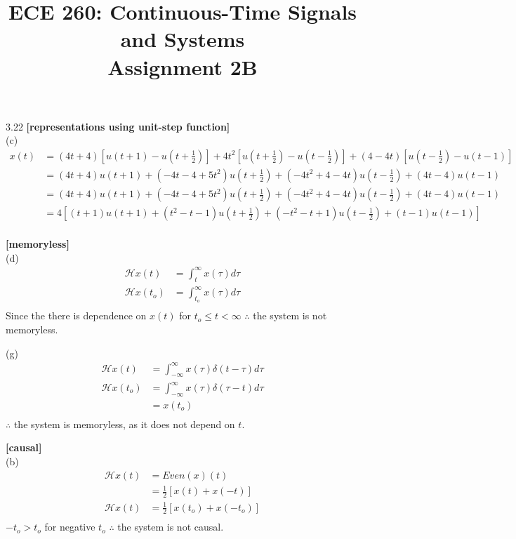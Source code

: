 \documentclass{article}
\title{%
   ECE 260: Continuous-Time Signals and Systems\\
    Assignment 2B\\
    }
\date{}
\begin{document}
\maketitle

3.22 {\bf [representations using unit-step function]}\\
(c)
\begin{equation*}
\begin{split}
    x(t) &= (4t + 4)[u(t + 1) - u(t + \frac{1}{2})] + 4t^2[u(t + \frac{1}{2}) - u(t - \frac{1}{2})] + (4 - 4t)[u(t - \frac{1}{2}) - u(t - 1)]\\
    &= (4t + 4) u (t + 1) + (-4t - 4 + 5t^2) u (t + \frac{1}{2}) + (-4t^2 + 4 - 4t) u (t - \frac{1}{2}) + (4t - 4) u (t - 1)\\
    &= (4t + 4) u (t + 1) + (-4t - 4 + 5t^2) u (t + \frac{1}{2}) + (-4t^2 + 4 - 4t) u (t - \frac{1}{2}) + (4t - 4) u (t - 1)\\
    &= 4[(t + 1) u (t + 1) + (t^2 - t - 1) u (t + \frac{1}{2}) + (-t^2 - t + 1) u (t - \frac{1}{2}) + (t - 1) u (t - 1)]\\
\end{split}
\end{equation*}

 {\bf [memoryless]}\\
(d)
\begin{equation*}
\begin{split}
    \mathcal{H}x(t) &= \int_{t}^{\infty} x(\tau)d\tau\\
    \mathcal{H}x(t_o) &= \int_{t_o}^{\infty} x(\tau)d\tau\\
\end{split}
\end{equation*}
Since the there is dependence on $x(t)$ for $t_o \leq t < \infty$ $\therefore$ the system is not memoryless.

(g)
\begin{equation*}
\begin{split}
    \mathcal{H}x(t) &= \int_{-\infty}^{\infty} x(\tau) \delta (t - \tau) d\tau\\
     \mathcal{H}x(t_o) &= \int_{-\infty}^{\infty} x(\tau) \delta (\tau - t) d\tau\\
    &= x(t_o)\\
\end{split}
\end{equation*}
$\therefore$ the system is memoryless, as it does not depend on $t$.


 {\bf [causal]}\\
(b)
\begin{equation*}
\begin{split}
    \mathcal{H}x(t) &= Even(x)(t)\\
    &= \frac{1}{2}[x(t) + x(-t)]\\
    \mathcal{H}x(t) &= \frac{1}{2}[x(t_o) + x(-t_o)]\\
\end{split}
\end{equation*}
$-t_o > t_o$ for negative $t_o$ $\therefore$ the system is not causal.
\end{document}
